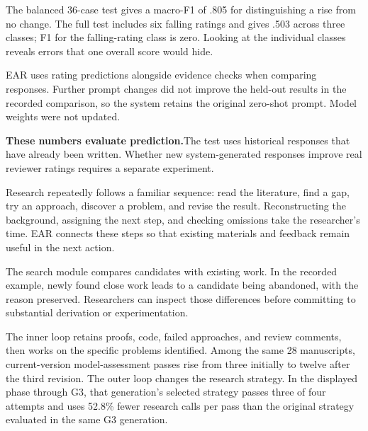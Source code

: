 The balanced 36-case test gives a macro-F1 of .805 for distinguishing a rise from no change. The full test includes six falling ratings and gives .503 across three classes; F1 for the falling-rating class is zero. Looking at the individual classes reveals errors that one overall score would hide.

EAR uses rating predictions alongside evidence checks when comparing responses. Further prompt changes did not improve the held-out results in the recorded comparison, so the system retains the original zero-shot prompt. Model weights were not updated.

\begin{insight}
\textbf{These numbers evaluate prediction.}\quad The test uses historical responses that have already been written. Whether new system-generated responses improve real reviewer ratings requires a separate experiment.
\end{insight}

Research repeatedly follows a familiar sequence: read the literature, find a gap, try an approach, discover a problem, and revise the result. Reconstructing the background, assigning the next step, and checking omissions take the researcher's time. EAR connects these steps so that existing materials and feedback remain useful in the next action.

The search module compares candidates with existing work. In the recorded example, newly found close work leads to a candidate being abandoned, with the reason preserved. Researchers can inspect those differences before committing to substantial derivation or experimentation.

The inner loop retains proofs, code, failed approaches, and review comments, then works on the specific problems identified. Among the same 28 manuscripts, current-version model-assessment passes rise from three initially to twelve after the third revision. The outer loop changes the research strategy. In the displayed phase through G3, that generation's selected strategy passes three of four attempts and uses 52.8\% fewer research calls per pass than the original strategy evaluated in the same G3 generation.


